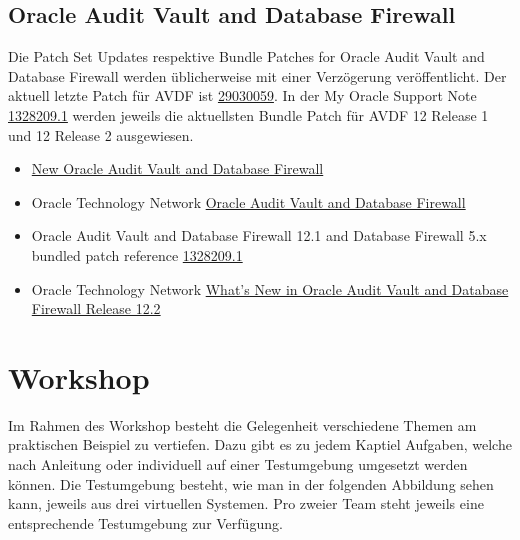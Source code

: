 \hypertarget{oracle-audit-vault-and-database-firewall}{%
\subsection{Oracle Audit Vault and Database
Firewall}\label{oracle-audit-vault-and-database-firewall}}

Die Patch Set Updates respektive Bundle Patches for Oracle Audit Vault
and Database Firewall werden üblicherweise mit einer Verzögerung
veröffentlicht. Der aktuell letzte Patch für AVDF ist
\href{https://support.oracle.com/epmos/faces/ui/patch/PatchDetail.jspx?patchId=29030059}{29030059}.
In der My Oracle Support Note
\href{https://support.oracle.com/epmos/faces/DocumentDisplay?id=1328209.1}{1328209.1}
werden jeweils die aktuellsten Bundle Patch für AVDF 12 Release 1 und 12
Release 2 ausgewiesen.

\begin{itemize}
\tightlist
\item
  \href{http://www.oradba.ch/2013/01/new-oracle-audit-vault-and-database-firewall}{New
  Oracle Audit Vault and Database Firewall}
\item
  Oracle Technology Network
  \href{http://www.oracle.com/us/products/database/security/audit-vault-database-firewall/overview/index.html}{Oracle
  Audit Vault and Database Firewall}
\item
  Oracle Audit Vault and Database Firewall 12.1 and Database Firewall
  5.x bundled patch reference
  \href{https://support.oracle.com/epmos/faces/DocumentDisplay?id=1328209.1}{1328209.1}
\item
  Oracle Technology Network
  \href{http://www.oracle.com/technetwork/database/database-technologies/audit-vault-and-database-firewall/overview/audit-vault-firewall-whatsnew-1958269.html}{What's
  New in Oracle Audit Vault and Database Firewall Release 12.2}
\end{itemize}

\hypertarget{workshop}{%
\section{Workshop}\label{workshop}}

Im Rahmen des Workshop besteht die Gelegenheit verschiedene Themen am
praktischen Beispiel zu vertiefen. Dazu gibt es zu jedem Kaptiel
Aufgaben, welche nach Anleitung oder individuell auf einer Testumgebung
umgesetzt werden können. Die Testumgebung besteht, wie man in der
folgenden Abbildung sehen kann, jeweils aus drei virtuellen Systemen.
Pro zweier Team steht jeweils eine entsprechende Testumgebung zur
Verfügung.

